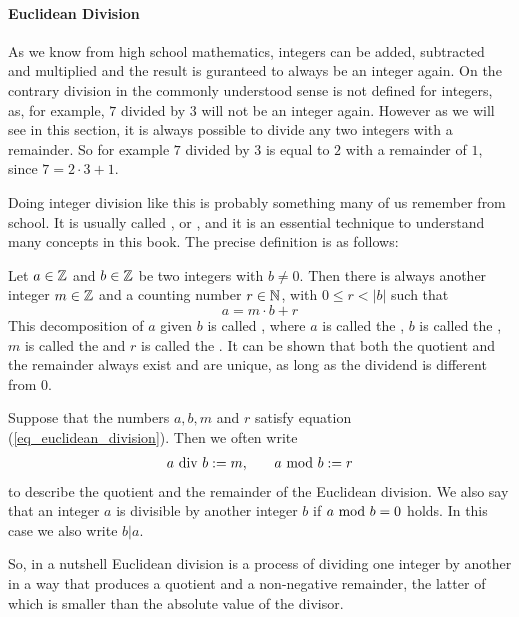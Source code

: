 \paragraph{Euclidean Division}
\label{Euclidean_division}
As we know from high school mathematics, integers can be added, subtracted and multiplied and the result is guranteed to always be an integer again.
On the contrary division in the commonly understood sense is not defined for integers, as, for example, $7$ divided by $3$ will not be an integer again. However as we will see in this section, it is always possible to divide any two integers with a remainder. So for example $7$ divided by $3$ is equal to $2$ with a remainder of $1$, since $7 = 2\cdot 3 + 1$. 

Doing integer division like this is probably something many of us remember from school. It is usually called , or , and it is an essential technique to understand many concepts in this book. The precise definition is as follows:

Let $ a \in \mathbb{Z} $ and $ b \in \mathbb{Z} $ be two integers with $b\neq 0$. Then there is always another integer $ m \in \mathbb{Z} $ and a counting number $ r \in \mathbb{N} $, with $ 0 \leq r <|b| $ such that
\begin{equation}
\label{eq_euclidean_division}
a = m \cdot b + r
\end{equation}
This decomposition of $a$ given $b$ is called , where $ a $ is called the , $ b $ is called the , $m$ is called the  and $r$ is called the . It can be shown that both the quotient and the remainder always exist and are unique, as long as the dividend is different from $0$. 
\begin{notation}
\label{eq_euclidean_division_notation}
Suppose that the numbers $ a, b, m $ and $ r $ satisfy equation (\ref{eq_euclidean_division}). Then we often write 
\begin{equation}
\label{def_integer_division_and_modulus}
\begin{array}{lcr}
a \text{ div } b: = m, & & a \text{ mod } b: = r 
\end{array}
\end{equation}
to describe the quotient and the remainder of the Euclidean division. We also say that an integer $ a $ is divisible by another integer $ b $ if $ a \text{ mod } b = 0 $ holds. In this case we also write $ b | a $.
\end{notation}
So, in a nutshell Euclidean division is a process of dividing one integer by another in a way that produces a quotient and a non-negative remainder, the latter of which is smaller than the absolute value of the divisor. 

